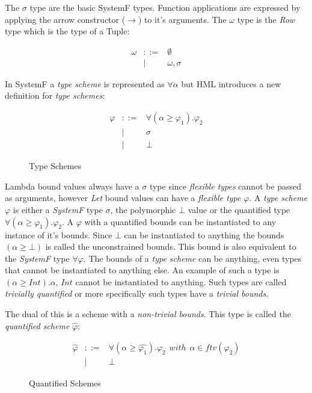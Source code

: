 \documentclass[twoside, titlepage, openright, a4paper]{book}
\renewcommand{\geq}{\geqslant}
\begin{document}
The $\sigma$ type are the basic SystemF types. Function applications are expressed by applying the arrow constructor ($\rightarrow$) to it's arguments. The $\omega$ type is the \emph{Row} type which is the type of a Tuple:

\begin{eqnarray*}
\omega & ::= & \emptyset \\
       & | & \omega , \sigma
\end{eqnarray*}

In SystemF a \emph{type scheme} is represented as $\forall \alpha$ but HML introduces a new definition for \emph{type schemes}:

\begin{figure}[H]
\begin{eqnarray*}
\varphi & ::= & \forall (\alpha \geq \varphi_1). \varphi_2 \\
        & | & \sigma \\
        & | & \bot
\end{eqnarray*}
\caption{Type Schemes}
\label{type-schemes}
\end{figure}

Lambda bound values always have a $\sigma$ type since \emph{flexible types} cannot be passed as arguments, however \emph{Let} bound values can have a \emph{flexible type} $\varphi$.
A \emph{type scheme} $\varphi$ is either a \emph{SystemF} type $\sigma$, the polymorphic $\bot$ value or the quantified type $\forall (\alpha \geq \varphi_1). \varphi_2$. A $\varphi$ with a quantified bounds can be instantiated to any instance of it's bounds. Since $\bot$ can be instantiated to anything the bounds $(\alpha \geq \bot)$ is called the unconstrained bounds. This bound is also equivalent to the \emph{SystemF} type $\forall \varphi$. The bounds of a \emph{type scheme} can be anything, even types that cannot be instantiated to anything else. An example of such a type is $(\alpha \geq Int).\alpha$, $Int$ cannot be instantiated to anything. Such types are called \emph{trivially quantified} or more specifically such types have a \emph{trivial bounds}.

The dual of this is a scheme with a \emph{non-trivial bounds}. This type is called the \emph{quantified scheme} $\hat{\varphi}$:

\begin{figure}[H]
\begin{eqnarray*}
\hat{\varphi} & ::= & \forall (\alpha \geq \hat{\varphi_1}). \varphi_2 \hspace{5pt} with \hspace{5pt} \alpha \in ftv(\varphi_2) \\
              & | & \bot
\end{eqnarray*}
\caption{Quantified Schemes}
\label{quantified-schemes}
\end{figure}
\end{document}

